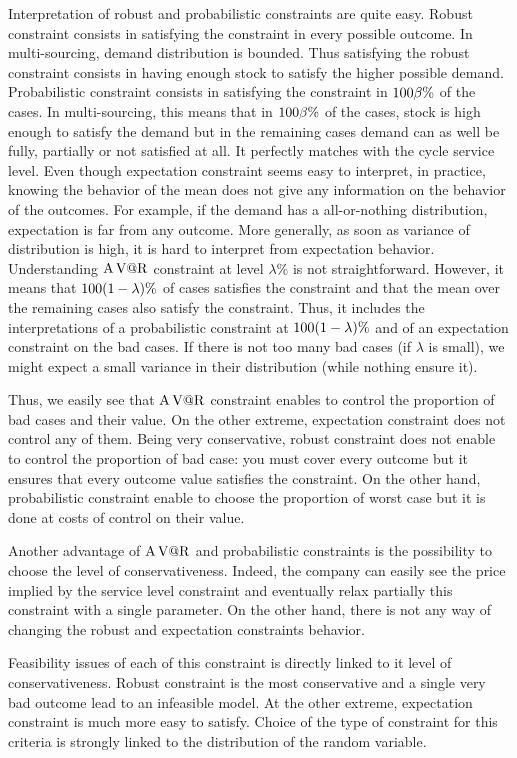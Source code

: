 Interpretation of robust and probabilistic constraints are quite easy.
Robust constraint consists in satisfying the constraint in every possible outcome.
In multi-sourcing, demand distribution is bounded.
Thus satisfying the robust constraint consists in having enough stock to satisfy the higher possible demand.
Probabilistic constraint consists in satisfying the constraint in $100\beta\%$ of the cases.
In multi-sourcing, this means that in $100\beta\%$ of the cases, stock is high enough to satisfy the demand but in the remaining cases demand can as well be fully, partially or not satisfied at all.
It perfectly matches with the cycle service level.
Even though expectation constraint seems easy to interpret, in practice, knowing the behavior of the mean does not give any information on the behavior of the outcomes.
For example, if the demand has a all-or-nothing distribution, expectation is far from any outcome.
More generally, as soon as variance of distribution is high, it is hard to interpret from expectation behavior.
Understanding $\operatorname{A\operatorname{V@R}}$ constraint at level $\lambda\%$ is not straightforward.
However, it means that $100\bracket{1-\lambda}\%$ of cases satisfies the constraint and that the mean over the remaining cases also satisfy the constraint.
Thus, it includes the interpretations of a probabilistic constraint at $100\bracket{1-\lambda}\%$ and of an expectation constraint on the bad cases.
If there is not too many bad cases (\ie if $\lambda$ is small), we might expect a small variance in their distribution (while nothing ensure it).


Thus, we easily see that $\operatorname{A\operatorname{V@R}}$ constraint enables to control the proportion of bad cases and their value.
On the other extreme, expectation constraint does not control any of them.
Being very conservative, robust constraint does not enable to control the proportion of bad case: you must cover every outcome but it ensures that every outcome value satisfies the constraint.
On the other hand, probabilistic constraint enable to choose the proportion of worst case but it is done at costs of control on their value.


Another advantage of $\operatorname{A\operatorname{V@R}}$ and probabilistic constraints is the possibility to choose the level of conservativeness.
Indeed, the company can easily see the price implied by the service level constraint and eventually relax partially this constraint with a single parameter.
On the other hand, there is not any way of changing the robust and expectation constraints behavior.


Feasibility issues of each of this constraint is directly linked to it level of conservativeness.
Robust constraint is the most conservative and a single very bad outcome lead to an infeasible model.
At the other extreme, expectation constraint is much more easy to satisfy.
Choice of the type of constraint for this criteria is strongly linked to the distribution of the random variable.


